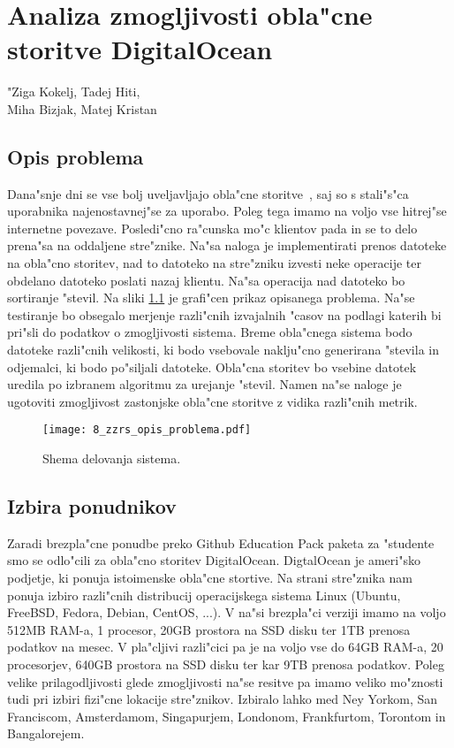 \chapter[Analiza zmogljivosti obla"cne storitve DigitalOcean]{Analiza zmogljivosti obla"cne storitve DigitalOcean}

\pagestyle{fancy}
\fancyhf{}
\fancyhead[LE,RO]{\thepage}
\fancyhead[RE,LO]{\leftmark}

\huge "Ziga Kokelj, Tadej Hiti,\\Miha Bizjak, Matej Kristan
\normalsize
\bigskip

\section{Opis problema} \label{8_opis_problema}
\noindent Dana"snje dni se vse bolj uveljavljajo obla"cne storitve~\cite{8_servers}, saj so s stali"s"ca uporabnika najenostavnej"se za uporabo. Poleg tega imamo na voljo vse hitrej"se internetne povezave. Posledi"cno ra"cunska mo"c klientov pada in se to delo prena"sa na oddaljene stre"znike.  Na"sa naloga je implementirati prenos datoteke na obla"cno storitev, nad to datoteko na stre"zniku izvesti neke operacije ter obdelano datoteko poslati nazaj klientu. Na"sa operacija nad datoteko bo sortiranje "stevil. Na sliki \ref{8_opis_problema} je grafi"cen prikaz opisanega problema. Na"se testiranje bo obsegalo merjenje razli"cnih izvajalnih "casov na podlagi katerih bi pri"sli do podatkov o zmogljivosti sistema. Breme obla"cnega sistema bodo datoteke razli"cnih velikosti, ki bodo vsebovale naklju"cno generirana "stevila in odjemalci, ki bodo po"siljali datoteke. Obla"cna storitev bo vsebine datotek uredila po izbranem algoritmu za urejanje "stevil. Namen na"se naloge je ugotoviti zmogljivost zastonjske obla"cne storitve z vidika razli"cnih metrik.

\begin{figure}
  \centering
    \texttt{[image: 8\_zzrs\_opis\_problema.pdf]}
  \caption{Shema delovanja sistema.}
  \label{8_opis_problema}
\end{figure}


\section{Izbira ponudnikov}
Zaradi brezpla"cne ponudbe preko Github Education Pack paketa za "studente smo se odlo"cili za obla"cno storitev DigitalOcean. DigtalOcean je ameri"sko podjetje, ki ponuja istoimenske obla"cne stortive. Na strani stre"znika nam ponuja izbiro razli"cnih distribucij operacijskega sistema Linux (Ubuntu, FreeBSD, Fedora, Debian, CentOS, ...).
V na"si brezpla"ci verziji imamo na voljo 512MB RAM-a, 1 procesor, 20GB prostora na SSD disku ter 1TB prenosa podatkov na mesec. V pla"cljivi razli"cici pa je na voljo vse do 64GB RAM-a, 20 procesorjev, 640GB prostora na SSD disku ter kar 9TB prenosa podatkov. Poleg velike prilagodljivosti glede zmogljivosti na"se resitve pa imamo veliko mo"znosti tudi pri izbiri fizi"cne lokacije stre"znikov. 
Izbiralo lahko med Ney Yorkom, San Franciscom, Amsterdamom, Singapurjem, Londonom, Frankfurtom, Torontom in Bangalorejem. 

